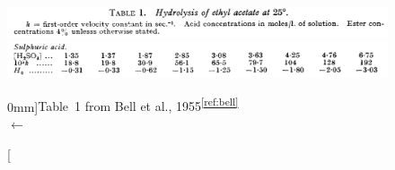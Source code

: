 \documentclass[]{tufte-handout}
\newcommand{\tss}[1]{\textsuperscript{#1}}
\begin{document}
\begin{figure}[h!]
\vspace{0mm}
  \centering
  \includegraphics[scale=0.18]{images/Belltable1A.png} \\
  \includegraphics[scale=0.18]{images/Belltable1B.png}
  \caption[][0mm]{Table~1 from Bell et al., 1955\tss{\ref{ref:bell}}  \\  $\longleftarrow$ \vspace{3mm}}

  \label{fig:belldata}
\end{figure}
\end{document}
